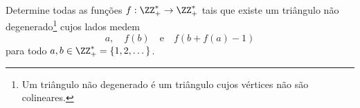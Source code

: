 Determine todas as funções $f: \ZZ_+^* \to \ZZ_+^*$ tais que existe um triângulo não degenerado\footnote{Um triângulo não degenerado é um triângulo cujos vértices não são colineares.} cujos lados medem
$$a, \quad f(b) \quad \mathrm{e} \quad f(b+f(a)-1)$$
para todo $a, b \in \ZZ_+^* = \{1, 2, \dots\}$.
